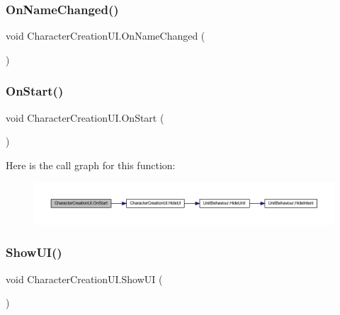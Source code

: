 \subsubsection{\texorpdfstring{OnNameChanged()}{OnNameChanged()}}
{\footnotesize\ttfamily void Character\+Creation\+U\+I.\+On\+Name\+Changed (\begin{DoxyParamCaption}{ }\end{DoxyParamCaption})}

\mbox{\label{class_character_creation_u_i_a656b1552f06f9611f9672489e03f8936}} 
\subsubsection{\texorpdfstring{OnStart()}{OnStart()}}
{\footnotesize\ttfamily void Character\+Creation\+U\+I.\+On\+Start (\begin{DoxyParamCaption}{ }\end{DoxyParamCaption})}

Here is the call graph for this function\+:\nopagebreak
\begin{figure}[H]
\begin{center}
\leavevmode
\includegraphics[width=350pt]{class_character_creation_u_i_a656b1552f06f9611f9672489e03f8936_cgraph}
\end{center}
\end{figure}
\mbox{\label{class_character_creation_u_i_a5e683c30d28a4c97d8f84de3de2062cd}} 
\subsubsection{\texorpdfstring{ShowUI()}{ShowUI()}}
{\footnotesize\ttfamily void Character\+Creation\+U\+I.\+Show\+UI (\begin{DoxyParamCaption}{ }\end{DoxyParamCaption})}

